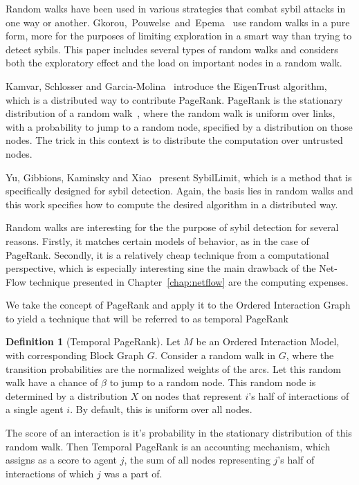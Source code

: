 \documentclass[a4paper,11pt]{book}
\theoremstyle{definition}
\newtheorem{definition}{Definition}
\begin{document}
Random walks have been used in various strategies that combat sybil attacks
in one way or another. Gkorou,~Pouwelse~and~Epema~\cite{gkorou2015trust} use random walks
in a pure form, more for the purposes of limiting exploration in
a smart way than trying to detect sybils. This paper includes several types
of random walks and considers both the exploratory effect and the
load on important nodes in a random walk.

Kamvar, Schlosser and Garcia-Molina~\cite{kamvar2003eigentrust} introduce
the EigenTrust algorithm, which is a distributed way to contribute PageRank.
PageRank is the stationary distribution of a random walk~\cite{page1999pagerank},
where the random walk is uniform over links, with a probability to jump to a
random node, specified by a distribution on those nodes. The trick in this context
is to distribute the computation over untrusted nodes. 

Yu, Gibbions, Kaminsky and Xiao~\cite{yu2008sybillimit} present SybilLimit, which
is a method that is specifically designed for sybil detection. Again, the basis
lies in random walks and this work specifies how to compute the desired
algorithm in a distributed way.

Random walks are interesting for the the purpose of sybil detection for several reasons.
Firstly, it matches certain models of behavior, as in the case of PageRank. Secondly, it 
is a relatively cheap technique from a computational perspective, which is especially
interesting sine the main
drawback of the Net-Flow technique presented in Chapter~\ref{chap:netflow} 
are the computing expenses.

We take the concept of PageRank and apply it to the Ordered Interaction Graph to
yield a technique that will be referred to as temporal PageRank

\begin{definition}[Temporal PageRank]
    Let $M$ be an Ordered Interaction Model, with corresponding Block Graph $G$.
    Consider a random walk in $G$, where the transition probabilities are the normalized
    weights of the arcs. Let this random walk have a chance of $\beta$ to jump to a random node.
    This random node is determined by a distribution $X$ on nodes that represent $i$'s half of interactions of
    a single agent $i$. By default, this is uniform over all nodes.

    The score of an interaction is it's probability in the stationary distribution of this random walk.
    Then Temporal PageRank is an accounting mechanism, which assigns as a score to agent $j$, the
    sum of all nodes representing $j$'s half of interactions of which $j$ was a part of.
\end{definition}
\end{document}
